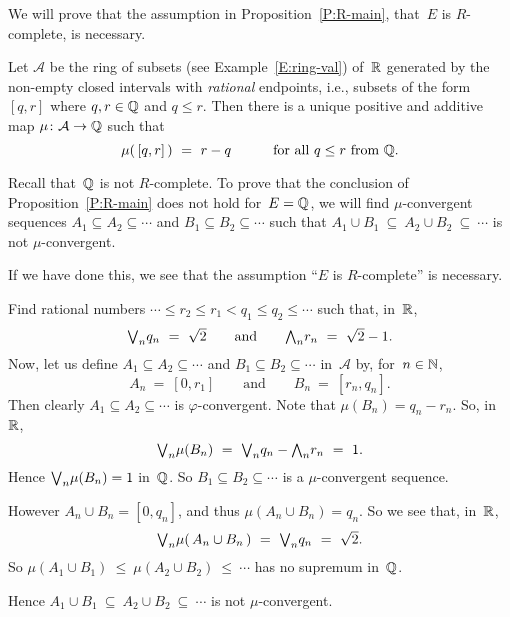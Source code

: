 \documentclass[main.tex]{subfiles}
\begin{document}
%
%
\begin{ex}
\label{E:P:R-main}
We will prove that
the assumption in Proposition~\ref{P:R-main},
that~$E$ is $R$-complete, is necessary.

Let $\mathcal{A}$ be the ring of subsets (see Example~\ref{E:ring-val})
of~$\mathbb{R}$ generated by the non-empty closed intervals with \emph{rational}
 endpoints,
i.e., subsets of the form $[q,r]$ where $q,r\in \mathbb{Q}$ and $q\leq r$.
Then there is a unique positive and additive map $\mu\colon\mathcal{A} \rightarrow\mathbb{Q}$
such that
\begin{equation*}
\mu(\,[q,r]\,) \ =\ r-q\qquad\quad\text{for all $q\leq r$ from $\mathbb{Q}$}.
\end{equation*}

Recall that~$\mathbb{Q}$ is not $R$-complete.
To prove that the conclusion of Proposition~\ref{P:R-main}
does not hold for~$E=\mathbb{Q}$, we will find $\mu$-convergent 
sequences $A_1 \subseteq A_2 \subseteq \dotsb$
and $B_1 \subseteq B_2 \subseteq\dotsb$ such that
$A_1 \cup B_1 \ \subseteq\ A_2 \cup B_2 \ \subseteq\ \dotsb$
is not $\mu$-convergent.

If we have done this,
we see that the assumption ``$E$ is $R$-complete''
is necessary.

Find rational numbers $ \dotsb \leq r_2 \leq r_1 < q_1 \leq q_2 \leq \dotsb$
such that, in~$\mathbb{R}$,
\begin{equation*}
\textstyle{\bigvee}_n q_n \ = \ \sqrt2\qquad\text{and}\qquad
\textstyle{\bigwedge}_n r_n \ = \ \sqrt2-1.
\end{equation*}
Now, let us define $A_1 \subseteq A_2 \subseteq \dotsb$
and $B_1 \subseteq B_2 \subseteq \dotsb$ in~$\mathcal{A}$
by, for~$n\in\mathbb{N}$,
\begin{equation*}
A_n  \ = \ [0, r_1]
\qquad\text{and}\qquad
B_n \ = \ [r_n,q_n].
\end{equation*}
Then clearly $A_1 \subseteq A_2 \subseteq \dotsb$
is $\varphi$-convergent.
Note that $\mu(B_n) = q_n - r_n$. So, in~$\mathbb{R}$,
\begin{equation*}
\bv_n \mu(B_n) \ =\ \bv_n q_n - \bw_n r_n \ =\ 1.
\end{equation*}
Hence $\textstyle{\bigvee}_n \mu(B_n)=1$ in~$\mathbb{Q}$.
So  $B_1 \subseteq B_2 \subseteq \dotsb$
is a $\mu$-convergent sequence.

However $A_n \cup B_n = [0,q_n]$,
and thus $\mu(A_n \cup B_n) = q_n$.
So we see that, in~$\mathbb{R}$,
\begin{equation*}
\bv_n \mu(\,A_n \cup B_n \,) \ =\ \bv_n q_n \ =\ \sqrt{2}.
\end{equation*}
So $\mu(A_1 \cup B_1) \ \leq\  \mu(A_2 \cup B_2) \ \leq\ \dotsb$
has no supremum in~$\mathbb{Q}$.

Hence $A_1 \cup B_1 \ \subseteq\ A_2 \cup B_2 \ \subseteq\ \dotsb$
is not $\mu$-convergent.
\end{ex}
\end{document}
